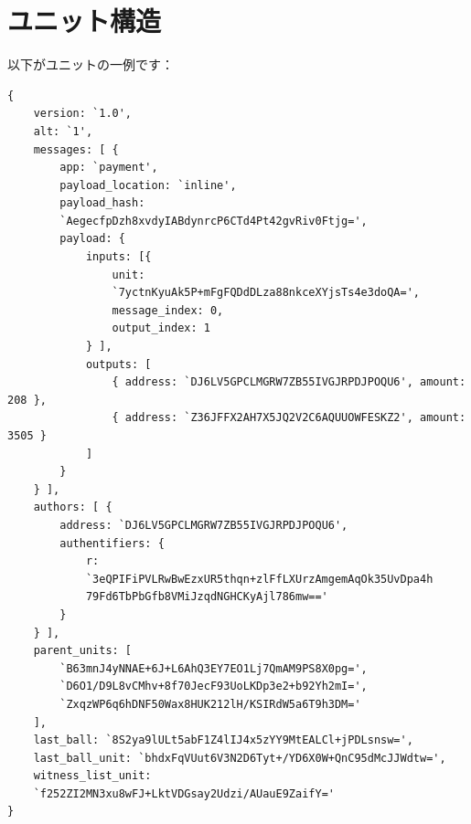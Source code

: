 \documentclass[a4paper, dvipdfmx]{jsarticle}
\begin{document}
\section{ユニット構造}
以下がユニットの一例です：
\begin{lstlisting}[basicstyle=\ttfamily\footnotesize, frame=none]
{
    version: `1.0',
    alt: `1',
    messages: [ {
        app: `payment',
        payload_location: `inline',
        payload_hash:
        `AegecfpDzh8xvdyIABdynrcP6CTd4Pt42gvRiv0Ftjg=',
        payload: {
            inputs: [{
                unit:
                `7yctnKyuAk5P+mFgFQDdDLza88nkceXYjsTs4e3doQA=',
                message_index: 0,
                output_index: 1
            } ],
            outputs: [
                { address: `DJ6LV5GPCLMGRW7ZB55IVGJRPDJPOQU6', amount: 208 },
                { address: `Z36JFFX2AH7X5JQ2V2C6AQUUOWFESKZ2', amount: 3505 }
            ]
        }
    } ],
    authors: [ {
        address: `DJ6LV5GPCLMGRW7ZB55IVGJRPDJPOQU6',
        authentifiers: {
            r:
            `3eQPIFiPVLRwBwEzxUR5thqn+zlFfLXUrzAmgemAqOk35UvDpa4h
            79Fd6TbPbGfb8VMiJzqdNGHCKyAjl786mw=='
        }
    } ],
    parent_units: [
        `B63mnJ4yNNAE+6J+L6AhQ3EY7EO1Lj7QmAM9PS8X0pg=',
        `D6O1/D9L8vCMhv+8f70JecF93UoLKDp3e2+b92Yh2mI=',
        `ZxqzWP6q6hDNF50Wax8HUK212lH/KSIRdW5a6T9h3DM='
    ],
    last_ball: `8S2ya9lULt5abF1Z4lIJ4x5zYY9MtEALCl+jPDLsnsw=',
    last_ball_unit: `bhdxFqVUut6V3N2D6Tyt+/YD6X0W+QnC95dMcJJWdtw=',
    witness_list_unit:
    `f252ZI2MN3xu8wFJ+LktVDGsay2Udzi/AUauE9ZaifY='
}
\end{lstlisting}
\end{document}
